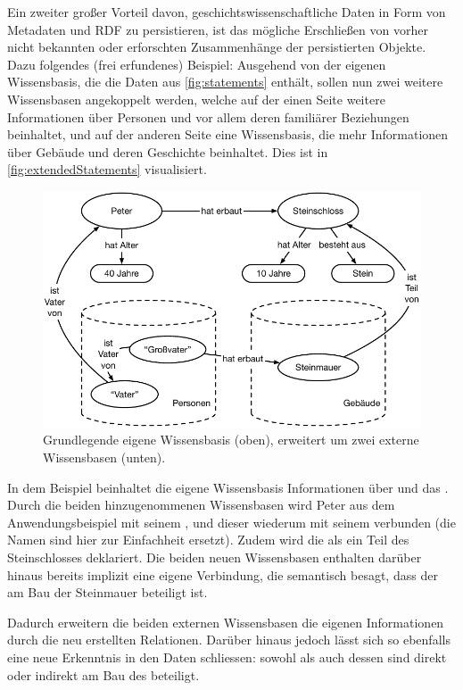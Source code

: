 Ein zweiter großer Vorteil davon, geschichtswissenschaftliche Daten in Form von Metadaten und RDF zu persistieren, ist das mögliche Erschließen von vorher nicht bekannten oder erforschten Zusammenhänge der persistierten Objekte. Dazu folgendes (frei erfundenes) Beispiel: Ausgehend von der eigenen Wissensbasis, die die Daten aus \autoref{fig:statements} enthält, sollen nun zwei weitere Wissensbasen angekoppelt werden, welche auf der einen Seite weitere Informationen über Personen und vor allem deren familiärer Beziehungen beinhaltet, und auf der anderen Seite eine Wissensbasis, die mehr Informationen über Gebäude und deren Geschichte beinhaltet. Dies ist in \autoref{fig:extendedStatements} visualisiert.

\begin{figure}[htb]
    \centering
    \includegraphics[width=\textwidth]{Figures/berndl/extendedStatements}
    \caption{\label{fig:extendedStatements} Grundlegende eigene Wissensbasis (oben), erweitert um zwei externe Wissensbasen (unten).}
\end{figure}

In dem Beispiel beinhaltet die eigene Wissensbasis Informationen über  und das . Durch die beiden hinzugenommenen Wissensbasen wird Peter aus dem Anwendungsbeispiel mit seinem , und dieser wiederum mit seinem  verbunden (die Namen sind hier zur Einfachheit ersetzt). Zudem wird die  als ein Teil des Steinschlosses deklariert. Die beiden neuen Wissensbasen enthalten darüber hinaus bereits implizit eine eigene Verbindung, die semantisch besagt, dass der  am Bau der Steinmauer beteiligt ist.

Dadurch erweitern die beiden externen Wissensbasen die eigenen Informationen durch die neu erstellten Relationen. Darüber hinaus jedoch lässt sich so ebenfalls eine neue Erkenntnis in den Daten schliessen: sowohl  als auch dessen  sind direkt oder indirekt am Bau des  beteiligt.

